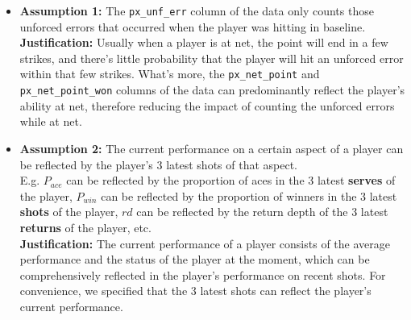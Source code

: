 \begin{itemize}
    \item \textbf{Assumption 1:} The \verb|px_unf_err| column of the data only counts those unforced errors that occurred when the player was hitting in baseline.\\
    \textbf{Justification:} Usually when a player is at net, the point will end in a few strikes, and there's little probability that the player will hit an unforced error within that few strikes. What's more, the \verb|px_net_point| and \verb|px_net_point_won| columns of the data can predominantly reflect the player's ability at net, therefore reducing the impact of counting the unforced errors while at net.
    
    \item \textbf{Assumption 2:} The current performance on a certain aspect of a player can be reflected by the player's 3 latest shots of that aspect.\\
    E.g. $P_{ace}$ can be reflected by the proportion of aces in the 3 latest \textbf{serves} of the player, $P_{win}$ can be reflected by the proportion of winners in the 3 latest \textbf{shots} of the player, $rd$ can be reflected by the return depth of the 3 latest \textbf{returns} of the player, etc. \\
    \textbf{Justification:} The current performance of a player consists of the average performance and the status of the player at the moment, which can be comprehensively reflected in the player's performance on recent shots. For convenience, we specified that the 3 latest shots can reflect the player's current performance.
\end{itemize}